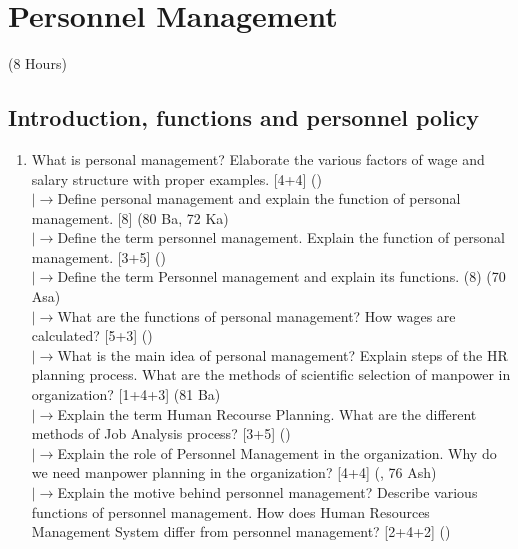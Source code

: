 \documentclass[12pt]{article}
\newcommand{\lb}{\\$\left|\rightarrow\right.$}
\begin{document}
\pagebreak
\section{Personnel Management}
\begin{center}(8 Hours)\end{center}

  \subsection{Introduction, functions and personnel policy}
    \begin{enumerate}[topsep=0pt, noitemsep]
      \item What is personal management? Elaborate the various factors of wage and salary structure with proper examples. \hfill [4+4] ()
        \lb Define personal management and explain the function of personal management. \hfill [8] (80 Ba, 72 Ka)
        \lb Define the term personnel management. Explain the function of personal management. \hfill [3+5] ()
        \lb Define the term Personnel management and explain its functions. \hfill (8) (70 Asa)
        \lb What are the functions of personal management? How wages are calculated? \hfill [5+3] ()
        \lb What is the main idea of personal management? Explain steps of the HR planning process. What are the methods of scientific selection of manpower in organization? \hfill [1+4+3] (81 Ba)
        \lb Explain the term Human Recourse Planning. What are the different methods of Job Analysis process? \hfill [3+5] ()
        \lb Explain the role of Personnel Management in the organization. Why do we need manpower planning in the organization? \hfill [4+4] (, 76 Ash)
        \lb Explain the motive behind personnel management? Describe various functions of personnel management. How does Human Resources Management System differ from personnel management? \hfill [2+4+2] ()


\end{enumerate}
\end{document}
